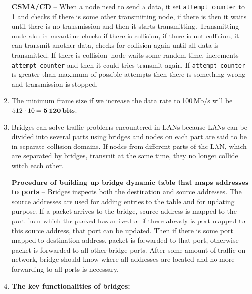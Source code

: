 \documentclass[a4paper, 11pt]{article}
\begin{document}
\begin{enumerate}
			\textbf{CSMA/CD} -- When a node need to send a data, it set \texttt{attempt counter} to 1 and checks if there is some other
			transmitting node, if there is then it waits until there is no transmission and then it starts transmitting. Transmitting node also
			in meantime checks if there is collision, if there is not collision, it can transmit another data, checks for collision again until
			all data is transmitted. If there is collision, node waits some random time, increments \texttt{attempt counter} and then it
			could tries transmit again. If \texttt{attempt counter} is greater than maximum of possible attempts then there is something
			wrong and transmission is stopped.

		\item %
			The minimum frame size if we increase the data rate to 100\,Mb/s will be
			$ 512 \cdot 10 = \boldsymbol{5\,120\,\text{\textbf{bits}}} $.

		\item %
			Bridges can solve traffic problems encountered in LANs because LANs can be divided into several parts using bridges
			and nodes on each part are said to be in separate collision domains. If nodes from different parts of the LAN, which
			are separated by bridges, transmit at the same time, they no longer collide witch each other.

			\textbf{Procedure of building up bridge dynamic table that maps addresses to ports} -- Bridges inspects both the
			destination and source addresses. The source addresses are used for adding entries to the table and for updating purpose.
			If a packet arrives to the bridge, source address is mapped to the port from which the packed has arrived or if there already is
			port mapped to this source address, that port can be updated. Then if there is some port mapped to destination address,
			packet is forwarded to that port, otherwise packet is forwarded to all other bridge ports. After some amount of traffic on
			network, bridge should know where all addresses are located and no more forwarding to all ports is necessary.

		\item %
			\textbf{The key functionalities of bridges:}
\end{enumerate}
\end{document}
